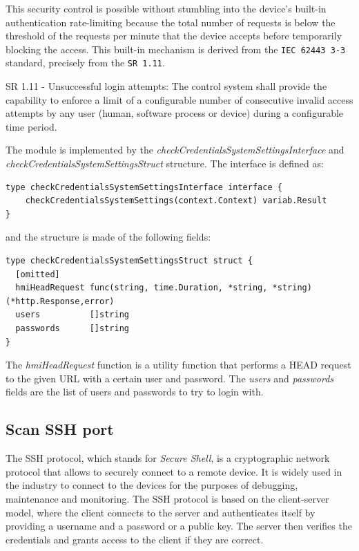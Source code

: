 This security control is possible without stumbling into the device's built-in authentication rate-limiting because the total number of requests is below the threshold of the requests per minute that the device accepts before temporarily blocking the access. This built-in mechanism is derived from the \texttt{IEC 62443 3-3} standard, precisely from the \texttt{SR 1.11}.

\begin{mdframed}
  SR 1.11 - Unsuccessful login attempts: The control system shall provide the capability to enforce a limit of a configurable number of consecutive invalid access attempts by any user (human, software process or device) during a configurable time period.
\end{mdframed}\label{sr:3-3_1-11}

The module is implemented by the \textit{checkCredentialsSystemSettingsInterface} and \textit{checkCredentialsSystemSettingsStruct} structure. The interface is defined as:

\begin{lstlisting}[style=golang]
type checkCredentialsSystemSettingsInterface interface {
	checkCredentialsSystemSettings(context.Context) variab.Result
}
\end{lstlisting}

and the structure is made of the following fields:

\begin{lstlisting}[style=golang]
type checkCredentialsSystemSettingsStruct struct {
  [omitted]
  hmiHeadRequest func(string, time.Duration, *string, *string) (*http.Response,error)
  users          []string
  passwords      []string
}
\end{lstlisting}

The \textit{hmiHeadRequest} function is a utility function that performs a HEAD request to the given URL with a certain user and password. The \textit{users} and \textit{passwords} fields are the list of users and passwords to try to login with.

\subsection{Scan SSH port}

The SSH protocol, which stands for \textit{Secure Shell}, is a cryptographic network protocol that allows to securely connect to a remote device. It is widely used in the industry to connect to the devices for the purposes of debugging, maintenance and monitoring. The SSH protocol is based on the client-server model, where the client connects to the server and authenticates itself by providing a username and a password or a public key. The server then verifies the credentials and grants access to the client if they are correct.

